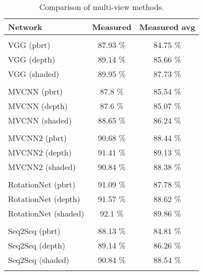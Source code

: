 \begin{table}[]
	\centering
	\begin{tabular}{lcc}
		\hline
		\textbf{Network}     & Measured & Measured avg \\ \hline
		                     &          &              \\
		VGG (pbrt)           & 87.93 \% &   84.75 \%   \\
		VGG (depth)          & 89.14 \% &   85.66 \%   \\
		VGG (shaded)         & 89.95 \% &   87.73 \%   \\
		                     &          &              \\
		MVCNN (pbrt)         & 87.8 \%  &   85.54 \%   \\
		MVCNN (depth)        & 87.6 \%  &   85.07 \%   \\
		MVCNN (shaded)       & 88.65 \% &   86.24 \%   \\
		                     &          &              \\
		MVCNN2 (pbrt)        & 90.68 \% &   88.44 \%   \\
		MVCNN2 (depth)       & 91.41 \% &   89.13 \%   \\
		MVCNN2 (shaded)      & 90.84 \% &   88.38 \%   \\
		                     &          &              \\
		RotationNet (pbrt)   & 91.09 \% &   87.78 \%   \\
		RotationNet (depth)  & 91.57 \% &   88.62 \%   \\
		RotationNet (shaded) & 92.1 \%  &   89.86 \%   \\
		                     &          &              \\
		Seq2Seq  (pbrt)      & 88.13 \% &   84.81 \%   \\
		Seq2Seq  (depth)     & 89.14 \% &   86.26 \%   \\
		Seq2Seq  (shaded)    & 90.84 \% &   88.54 \%   \\
		                     &          &              \\ \hline
	\end{tabular}
\caption{Comparison of multi-view methods.}
\label{Table:mv}
\end{table}